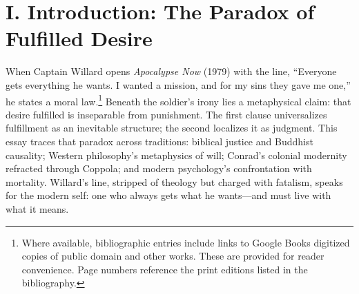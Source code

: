 \section*{I. Introduction: The Paradox of Fulfilled Desire}
\label{sec:i-introduction-the-paradox-of-fulfilled-desire}
When Captain Willard opens \textit{Apocalypse Now} (1979) with the line, ``Everyone gets everything he wants. I wanted a mission, and for my sins they gave me one,'' he states a moral law.\footnote{Where available, bibliographic entries include links to Google Books digitized copies of public domain and other works. These are provided for reader convenience. Page numbers reference the print editions listed in the bibliography.} Beneath the soldier’s irony lies a metaphysical claim: that desire fulfilled is inseparable from punishment. The first clause universalizes fulfillment as an inevitable structure; the second localizes it as judgment. This essay traces that paradox across traditions: biblical justice and Buddhist causality; Western philosophy’s metaphysics of will; Conrad’s colonial modernity refracted through Coppola; and modern psychology’s confrontation with mortality. Willard’s line, stripped of theology but charged with fatalism, speaks for the modern self: one who always gets what he wants—and must live with what it means.

